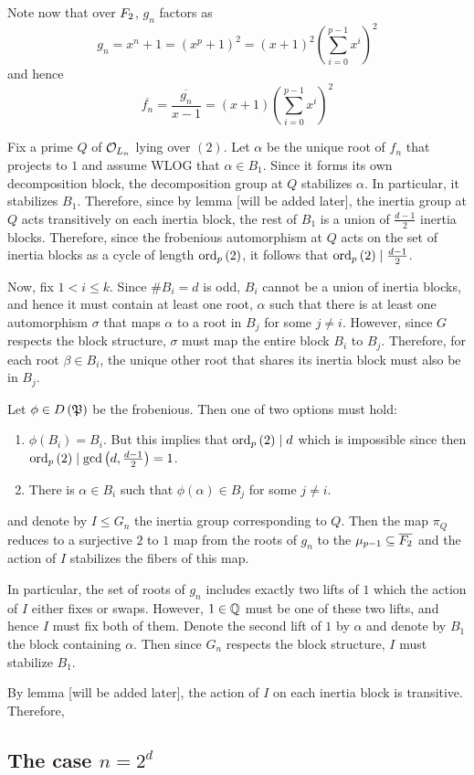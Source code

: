 \documentclass[../main.tex]{subfiles}
\begin{document}
Note now that over $\F_2$, $g_n$ factors as
\[
  g_n = x^n + 1 = \left( x^p + 1 \right)^2 = 
  \left( x + 1 \right)^2 \left( \sum_{i=0}^{p-1} x^i \right)^2
\]
and hence 
\[
  \overline{f_n} = \overline{\frac{ g_n }{ x - 1 }} = 
  \left( x + 1 \right) \left( \sum_{i=0}^{p-1} x^i \right)^2
\]

Fix a prime $Q$ of $\O_{L_n}$ lying over $(2)$.
Let $\alpha$ be the unique root of $f_n$ that projects to $1$ and assume WLOG that $\alpha \in B_1$.
Since it forms its own decomposition block, the decomposition group at $Q$ stabilizes $\alpha$.
In particular, it stabilizes $B_1$.
Therefore, since by lemma [will be added later], the inertia group at $Q$ acts transitively on each inertia block, the rest of $B_1$ is a union of $\frac{d - 1}{2}$ inertia blocks.
Therefore, since the frobenious automorphism at $Q$ acts on the set of inertia blocks as a cycle of length $\ord_p\left( 2 \right)$, it follows that $\ord_p\left( 2 \right) \mid \frac{d - 1}{2}$.

Now, fix $1 < i \leq k$.
Since $\#B_i = d$ is odd, $B_i$ cannot be a union of inertia blocks, and hence it must contain at least one root, $\alpha$ such that there is at least one automorphism $\sigma$ that maps $\alpha$ to a root in $B_j$ for some $j \neq i$.
However, since $G$ respects the block structure, $\sigma$ must map the entire block $B_i$ to $B_j$.
Therefore, for each root $\beta \in B_i$, the unique other root that shares its inertia block must also be in $B_j$.

Let $\phi \in D\left( \P \right)$ be the frobenious.
Then one of two options must hold:
\begin{enumerate}
  \item $\phi\left( B_i \right) = B_i$. But this implies that $\ord_p\left( 2 \right) \mid d$ which is impossible since then $\ord_p\left( 2 \right) \mid \gcd\left( d, \frac{d - 1}{2} \right) = 1$.
  \item There is $\alpha \in B_i$ such that $\phi\left( \alpha \right) \in B_j$ for some $j \neq i$.
\end{enumerate}


and denote by $I \leq G_n$ the inertia group 
corresponding to $Q$.
Then the map $\pi_Q$ reduces to a surjective $2$ to $1$ map from the roots of $g_n$ to the $\mu_{p - 1} \subseteq \overline{\F_{2}}$ and the action of $I$ stabilizes the fibers of this map.

In particular, the set of roots of $g_n$ includes exactly two lifts of $1$ which the action of $I$ either fixes or swaps.
However, $1 \in \Q$ must be one of these two lifts, and hence $I$ must fix both of them.
Denote the second lift of $1$ by $\alpha$ and denote by $B_1$ the block containing $\alpha$.
Then since $G_n$ respects the block structure, $I$ must stabilize $B_1$.

By lemma [will be added later], the action of $I$ on each inertia block is transitive.
Therefore,

\subsection{The case $n = 2^d$}
\end{document}
